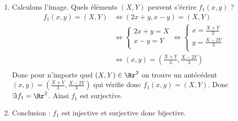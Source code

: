 {{\begin{enumerate}
\begin{enumerate}
   \item Calculons l'image. Quels éléments $(X,Y)$ peuvent s'écrire $f_1(x,y)$ ?
\begin{align*}
f_1(x,y) = (X,Y) 
  & \iff (2x+y,x-y) = (X,Y) \\
  &\iff \begin{cases}
         2x+y=X \\
         x-y=Y \\   
        \end{cases} 
  \iff \begin{cases}
         x=\frac{X+Y}{3} \\
         y=\frac{X-2Y}{3} \\   
        \end{cases} \\
  & \iff (x,y)=\left(\frac{X+Y}{3},\frac{X-2Y}{3}\right) \\
\end{align*}
Donc pour n'importe quel $(X,Y)\in\Rr^2$ on trouve un antécédent $(x,y)=(\frac{X+Y}{3},\frac{X-2Y}{3})$
qui vérifie donc $f_1(x,y)=(X,Y)$. Donc $\Im f_1 = \Rr^2$. Ainsi $f_1$ est surjective.

  \item Conclusion : $f_1$ est injective et surjective donc bijective.
  \end{enumerate}



\end{enumerate}}}
